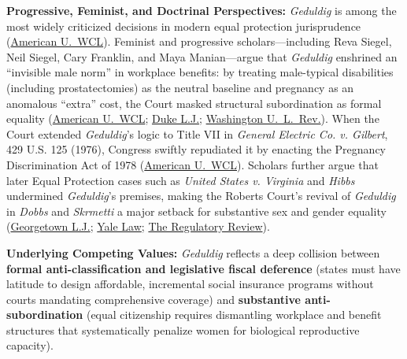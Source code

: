\documentclass[12pt]{article}
\begin{document}
\textbf{Progressive, Feminist, and Doctrinal Perspectives:} \textit{Geduldig} is among the most widely criticized decisions in modern equal protection jurisprudence (\href{https://digitalcommons.wcl.american.edu/cgi/viewcontent.cgi?article=1409&context=facsch_bk_contributions}{American U.\ WCL}). Feminist and progressive scholars---including Reva Siegel, Neil Siegel, Cary Franklin, and Maya Manian---argue that \textit{Geduldig} enshrined an ``invisible male norm'' in workplace benefits: by treating male-typical disabilities (including prostatectomies) as the neutral baseline and pregnancy as an anomalous ``extra'' cost, the Court masked structural subordination as formal equality (\href{https://digitalcommons.wcl.american.edu/cgi/viewcontent.cgi?article=1409&context=facsch_bk_contributions}{American U.\ WCL}; \href{https://scholarship.law.duke.edu/cgi/viewcontent.cgi?article=1450&context=dlj}{Duke L.J.}; \href{https://journals.library.wustl.edu/lawreview/article/5549/galley/22382/view/}{Washington U.\ L.\ Rev.}). When the Court extended \textit{Geduldig}'s logic to Title VII in \textit{General Electric Co. v. Gilbert}, 429 U.S. 125 (1976), Congress swiftly repudiated it by enacting the Pregnancy Discrimination Act of 1978 (\href{https://digitalcommons.wcl.american.edu/cgi/viewcontent.cgi?article=1409&context=facsch_bk_contributions}{American U.\ WCL}). Scholars further argue that later Equal Protection cases such as \textit{United States v. Virginia} and \textit{Hibbs} undermined \textit{Geduldig}'s premises, making the Roberts Court's revival of \textit{Geduldig} in \textit{Dobbs} and \textit{Skrmetti} a major setback for substantive sex and gender equality (\href{https://www.law.georgetown.edu/georgetown-law-journal/wp-content/uploads/sites/26/2020/07/The-Pregnant-Citizen-from-Suffrage-to-the-Present.pdf}{Georgetown L.J.}; \href{https://law.yale.edu/sites/default/files/documents/faculty/papers/franklin-siegel-equality-emerges-chapter-2-endnotes.pdf}{Yale Law}; \href{https://www.theregreview.org/2025/08/04/mayeri-shanor-trans-rights-and-the-future-of-sex-discrimination-law/}{The Regulatory Review}).

\textbf{Underlying Competing Values:} \textit{Geduldig} reflects a deep collision between \textbf{formal anti-classification and legislative fiscal deference} (states must have latitude to design affordable, incremental social insurance programs without courts mandating comprehensive coverage) and \textbf{substantive anti-subordination} (equal citizenship requires dismantling workplace and benefit structures that systematically penalize women for biological reproductive capacity).
\end{document}
